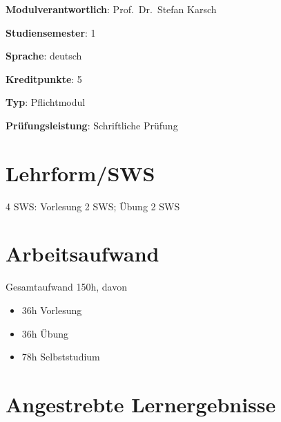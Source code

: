 \begin{modulHead}
\textbf{Modulverantwortlich}: Prof.~Dr.~Stefan
Karsch
\end{modulHead}
\begin{modulHead}
\textbf{Studiensemester}:
1
\end{modulHead}
\begin{modulHead}
\textbf{Sprache}:
deutsch
\end{modulHead}
\begin{modulHead}
\textbf{Kreditpunkte}:
5
\end{modulHead}
\begin{modulHead}
\textbf{Typ}:
Pflichtmodul
\end{modulHead}
\begin{modulHead}
\textbf{Prüfungsleistung}:
Schriftliche Prüfung
\end{modulHead}


\hypertarget{lehrformswspathlabelmi-2017modulbeschreibungen-bachelorba_einfhrunginbetriebssystemeundrechnerarchitektur}{%
\section*{Lehrform/SWS\label{/mi-2017/modulbeschreibungen-bachelor/BA_EinfhrunginBetriebssystemeundRechnerarchitektur}}\label{lehrformswspathlabelmi-2017modulbeschreibungen-bachelorba_einfhrunginbetriebssystemeundrechnerarchitektur}}

4 SWS: Vorlesung 2 SWS; Übung 2 SWS

\hypertarget{arbeitsaufwandpathlabelmi-2017modulbeschreibungen-bachelorba_einfhrunginbetriebssystemeundrechnerarchitektur}{%
\section*{Arbeitsaufwand\label{/mi-2017/modulbeschreibungen-bachelor/BA_EinfhrunginBetriebssystemeundRechnerarchitektur}}\label{arbeitsaufwandpathlabelmi-2017modulbeschreibungen-bachelorba_einfhrunginbetriebssystemeundrechnerarchitektur}}

Gesamtaufwand 150h, davon

\begin{itemize}
\tightlist
\item
  36h Vorlesung
\item
  36h Übung
\item
  78h Selbststudium
\end{itemize}

\hypertarget{angestrebte-lernergebnissepathlabelmi-2017modulbeschreibungen-bachelorba_einfhrunginbetriebssystemeundrechnerarchitektur}{%
\section*{Angestrebte
Lernergebnisse\label{/mi-2017/modulbeschreibungen-bachelor/BA_EinfhrunginBetriebssystemeundRechnerarchitektur}}\label{angestrebte-lernergebnissepathlabelmi-2017modulbeschreibungen-bachelorba_einfhrunginbetriebssystemeundrechnerarchitektur}}

